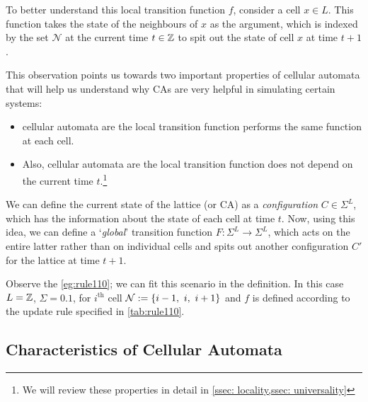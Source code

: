 \documentclass[11pt, oneside]{scrbook}
\begin{document}
To better understand this local transition function \(f\), consider a cell \(x \in L\). This function takes the state of the neighbours of \(x\) as the argument, which is indexed by the set \(\mathcal{N}\) at the current time \(t \in \mathbb Z\) to spit out the state of cell $x$ at time $t + 1$.

\noindent This observation points us towards two important properties of cellular automata that will help us understand why CAs are very helpful in simulating certain systems:

\begin{itemize}
    \item cellular automata are  \ie the local transition function performs the same function at each cell.
    \item Also, cellular automata are  \ie the local transition function does not depend on the current time $t$.\footnote{We will review these properties in detail in \cref{ssec: locality,ssec: universality}}
\end{itemize}

\noindent We can define the current state of the lattice (or CA) as a \emph{configuration} \(C \in \Sigma^{L}\), which has the information about the state of each cell at time \(t\). Now, using this idea, we can define a `\emph{global}' transition function \(F: \Sigma^{L} \to \Sigma^{L}\), which acts on the entire latter rather than on individual cells and spits out another configuration \(C'\) for the lattice at time \(t+1\).

\begin{remark}
    Observe the \cref{eg:rule110}; we can fit this scenario in the definition. In this case \(L = \mathbb Z\), \(\Sigma = \qty{0, 1}\), for $i^{\text{th}}$ cell \(\mathcal{N} := \qty{i-1,~ i,~ i+1}\) and \(f\) is defined according to the update rule specified in \cref{tab:rule110}.
\end{remark}

\pagebreak
\subsection{Characteristics of Cellular Automata}
\end{document}
